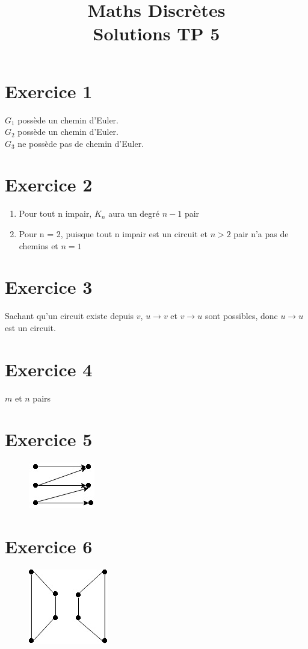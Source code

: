 \documentclass[fontsize=10pt]{article}
\title{\textbf{Maths Discrètes}\\ Solutions TP 5}
\date{}
\begin{document}
\maketitle %


\section*{Exercice 1}
$G_1$ possède un chemin d'Euler.\\
$G_2$ possède un chemin d'Euler.\\
$G_3$ ne possède pas de chemin d'Euler.

\section*{Exercice 2}
\begin{enumerate}
\item Pour tout n impair, $K_n$ aura un degré $n-1$ pair
\item Pour n = 2, puisque tout n impair est un circuit et $n>2$ pair n'a pas de chemins et $n=1$
\end{enumerate}

\section*{Exercice 3}

Sachant qu'un circuit existe depuis $v$, $u \rightarrow v$ et $v \rightarrow u$ sont possibles, donc $u \rightarrow u$ est un circuit.

\section*{Exercice 4}
$m$ et $n$ pairs
\section*{Exercice 5}
\begin{figure}[hbtp]
\centering
\includegraphics[scale=1]{TP5Exo5.jpg}
\end{figure}

\section*{Exercice 6}

\begin{figure}[hbtp]
\centering
\includegraphics[scale=1]{TP5Exo6.jpg}
\end{figure}
\end{document}
